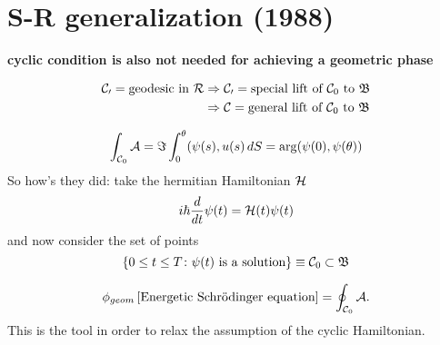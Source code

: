 \section{S-R generalization (1988)}
\textbf{cyclic condition is also not needed for achieving a geometric phase}

\begin{align}
\mathcal{C_0}= \text{geodesic in $ \mathcal{R} $}&\Rightarrow \mathcal{C_0}=\text{special lift of $ \mathcal{C}_0 $ to $ \mathfrak{B} $}\\
&\Rightarrow \mathcal{C}=\text{general lift of $ \mathcal{C}_0 $ to $ \mathfrak{B} $}
\end{align}

\begin{equation}
\int_{\mathcal{C}_0}\mathcal{A}=\Im\int_{0}^{\theta}(\psi(s),u(s)\mathop{}\!d S=\arg(\psi(0),\psi(\theta))
\end{equation}
So how's they did: take the hermitian Hamiltonian $ \mathcal{H} $
\begin{equation}
i\hbar \frac{d}{dt} \psi(t)=\mathcal{H}(t)\psi(t)
\end{equation}
and now consider the set of points 
\begin{equation}
\left\{0\leq t\leq T\colon\psi(t) \text{ is a solution} \right\}\equiv \mathcal{C}_0\subset \mathfrak{B}
\end{equation}

\begin{equation}
\phi_{geom}\left[\text{Energetic Schr\"odinger equation} \right]=\oint_{\mathcal{C}_0}\mathcal{A}.
\end{equation}
This is the tool in order to relax the assumption of the cyclic Hamiltonian.